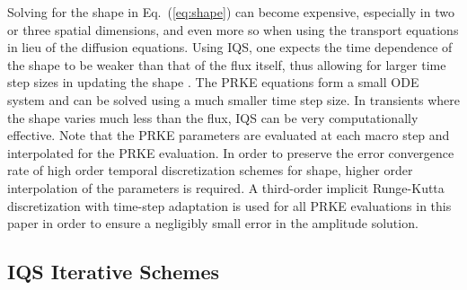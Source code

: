 \documentclass{elsarticle}
\newcommand{\eqt}[1]{Eq.~(\ref{#1})}                     %
\newcommand{\fig}[1]{Fig.~\ref{#1}}                      %
\begin{document}
Solving for the shape in \eqt{eq:shape} can become expensive, especially in two or three spatial dimensions, and even more so when using 
the transport equations in lieu of the diffusion equations.  Using IQS, one expects the time dependence of the shape to be weaker than that 
of the flux itself, thus allowing for larger time step sizes in updating the shape \cite{Ott_1966}. The PRKE equations form a small ODE system and can be 
solved using a much smaller time step size. In transients where the shape varies much less than the flux, IQS can be very computationally effective. 
%
Note that the PRKE parameters are evaluated at each macro step and interpolated for the PRKE evaluation. In order to preserve 
the error convergence rate of high order temporal discretization schemes for shape, higher order interpolation of the parameters is required. A third-order implicit Runge-Kutta \cite{sdirk33} discretization with time-step adaptation is used for all PRKE evaluations in this paper in 
order to ensure a negligibly small error in the amplitude solution.

\subsection{IQS Iterative Schemes}
\label{sect:iter}
\end{document}
